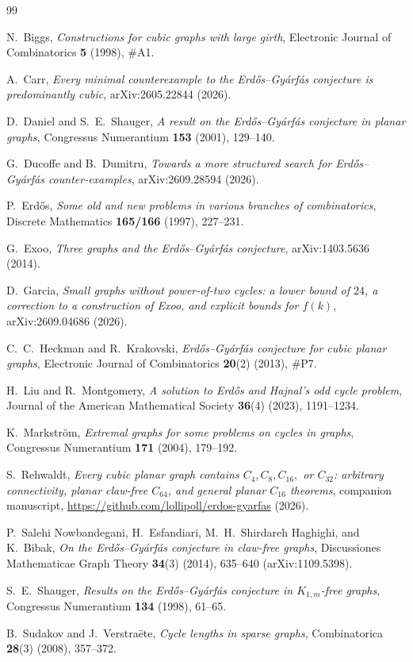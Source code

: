 \documentclass[11pt,reqno]{amsart}
\theoremstyle{plain}
\theoremstyle{definition}
\theoremstyle{remark}
\DeclareRobustCommand{\_}{\ifmmode\text{\textunderscore}\else\textunderscore\allowbreak\fi}
\begin{document}
\begin{thebibliography}{99}

N.~Biggs,
\emph{Constructions for cubic graphs with large girth},
Electronic Journal of Combinatorics \textbf{5} (1998), \#A1.

A.~Carr,
\emph{Every minimal counterexample to the Erd\H{o}s--Gy\'arf\'as conjecture is predominantly cubic},
arXiv:2605.22844 (2026).

D.~Daniel and S.~E.~Shauger,
\emph{A result on the Erd\H{o}s--Gy\'arf\'as conjecture in planar graphs},
Congressus Numerantium \textbf{153} (2001), 129--140.

G.~Ducoffe and B.~Dumitru,
\emph{Towards a more structured search for Erd\H{o}s--Gy\'arf\'as counter-examples},
arXiv:2609.28594 (2026).

P.~Erd\H{o}s,
\emph{Some old and new problems in various branches of combinatorics},
Discrete Mathematics \textbf{165/166} (1997), 227--231.

G.~Exoo,
\emph{Three graphs and the Erd\H{o}s--Gy\'arf\'as conjecture},
arXiv:1403.5636 (2014).

D.~Garcia,
\emph{Small graphs without power-of-two cycles: a lower bound of $24$, a correction to a construction of Exoo, and explicit bounds for $f(k)$},
arXiv:2609.04686 (2026).

C.~C.~Heckman and R.~Krakovski,
\emph{Erd\H{o}s--Gy\'arf\'as conjecture for cubic planar graphs},
Electronic Journal of Combinatorics \textbf{20}(2) (2013), \#P7.

H.~Liu and R.~Montgomery,
\emph{A solution to Erd\H{o}s and Hajnal's odd cycle problem},
Journal of the American Mathematical Society \textbf{36}(4) (2023), 1191--1234.

K.~Markstr\"om,
\emph{Extremal graphs for some problems on cycles in graphs},
Congressus Numerantium \textbf{171} (2004), 179--192.

S.~Rehwaldt,
\emph{Every cubic planar graph contains $C_4, C_8, C_{16},$ or $C_{32}$: arbitrary connectivity, planar claw-free $C_{64}$, and general planar $C_{16}$ theorems},
companion manuscript, \url{https://github.com/lollipoll/erdos-gyarfas} (2026).

P.~Salehi Nowbandegani, H.~Esfandiari, M.~H.~Shirdareh Haghighi, and K.~Bibak,
\emph{On the Erd\H{o}s--Gy\'arf\'as conjecture in claw-free graphs},
Discussiones Mathematicae Graph Theory \textbf{34}(3) (2014), 635--640 (arXiv:1109.5398).

S.~E.~Shauger,
\emph{Results on the Erd\H{o}s--Gy\'arf\'as conjecture in $K_{1,m}$-free graphs},
Congressus Numerantium \textbf{134} (1998), 61--65.

B.~Sudakov and J.~Verstra\"ete,
\emph{Cycle lengths in sparse graphs},
Combinatorica \textbf{28}(3) (2008), 357--372.

\end{thebibliography}
\end{document}
